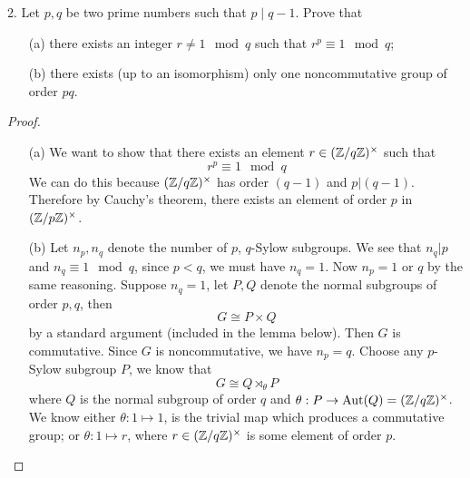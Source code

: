 \begin{prob}[F2019-Q2]
    2. Let \( p, q \) be two prime numbers such that \( p \mid q - 1 \). Prove that  
    \begin{itemize}
    \item[(a)]there exists an integer \( r \neq 1 \mod q \) such that \( r^p \equiv 1 \mod q \);
    \item[(b)] there exists (up to an isomorphism) only one noncommutative group of order \( pq \).
    \end{itemize}
\end{prob}
\begin{proof}
    \begin{itemize}
        \item[(a)] We want to show that there exists an element $r\in(\mathbb{Z}/q\mathbb{Z})^\times$ such that 
        \begin{equation*}
            r^p\equiv 1\mod q
        \end{equation*}
        We can do this because $(\mathbb{Z}/q\mathbb{Z})^\times$ has order $(q-1)$ and $p\vert (q-1)$. Therefore by Cauchy's theorem, there exists an element of order $p$ in $(\mathbb{Z}/p\mathbb{Z})^\times$.
        \item[(b)] Let $n_p,n_q$ denote the number of $p$, $q$-Sylow subgroups. We see that $n_q\vert p$ and $n_q\equiv 1\mod q$, since $p<q$, we must have $n_q=1$. Now $n_p=1$ or $q$ by the same reasoning. Suppose $n_q=1$, let $P,Q$ denote the normal subgroups of order $p,q$, then
        \begin{equation*}
            G\cong P\times Q
        \end{equation*}
        by a standard argument (included in the lemma below). Then $G$ is commutative. Since $G$ is noncommutative, we have $n_p=q$. Choose any $p$-Sylow subgroup $P$, we know that 
        \begin{equation*}
            G\cong Q\rtimes_\theta P
        \end{equation*} 
        where $Q$ is the normal subgroup of order $q$ and $\theta: P\to\text{Aut}(Q)=(\mathbb{Z}/q\mathbb{Z})^\times$. We know either $\theta: 1\mapsto 1$, is the trivial map which produces  a commutative group; or $\theta: 1\mapsto r$, where $r\in(\mathbb{Z}/q\mathbb{Z})^\times$ is some element of order $p$. 
        
        
    \end{itemize}
\end{proof}



